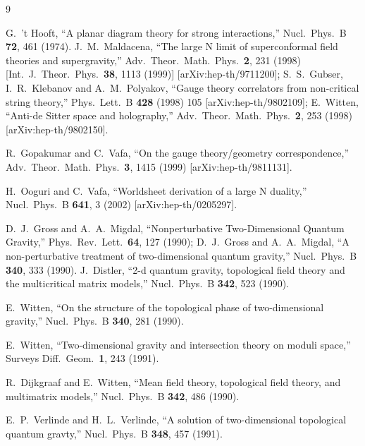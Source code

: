 \documentclass[11pt]{JHEP3}
\begin{document}
\begin{thebibliography}{9}

G.~'t Hooft, 
``A planar diagram theory for strong interactions,''
Nucl.\ Phys.\ B {\bf 72}, 461 (1974).
  J.~M.~Maldacena,
  ``The large N limit of superconformal field theories and supergravity,''
  Adv.\ Theor.\ Math.\ Phys.\  {\bf 2}, 231 (1998)
  [Int.\ J.\ Theor.\ Phys.\  {\bf 38}, 1113 (1999)]
  [arXiv:hep-th/9711200];
  S.~S.~Gubser, I.~R.~Klebanov and A.~M.~Polyakov,
  ``Gauge theory correlators from non-critical string theory,''
  Phys.\ Lett.\ B {\bf 428} (1998) 105
  [arXiv:hep-th/9802109];
  E.~Witten,
  ``Anti-de Sitter space and holography,''
  Adv.\ Theor.\ Math.\ Phys.\  {\bf 2}, 253 (1998)
  [arXiv:hep-th/9802150].

  R.~Gopakumar and C.~Vafa,
  ``On the gauge theory/geometry correspondence,''
  Adv.\ Theor.\ Math.\ Phys.\  {\bf 3}, 1415 (1999)
  [arXiv:hep-th/9811131].
  
  H.~Ooguri and C.~Vafa,
  ``Worldsheet derivation of a large N duality,''
  Nucl.\ Phys.\  B {\bf 641}, 3 (2002)
  [arXiv:hep-th/0205297].

  D.~J.~Gross and A.~A.~Migdal,
  ``Nonperturbative Two-Dimensional Quantum Gravity,''
  Phys.\ Rev.\ Lett.\  {\bf 64}, 127 (1990);
D.~J.~Gross and A.~A.~Migdal,
  ``A non-perturbative treatment of two-dimensional quantum gravity,''
  Nucl.\ Phys.\  B {\bf 340}, 333 (1990).
  J.~Distler,
  ``2-d quantum gravity, topological field theory and the multicritical matrix
  models,''
  Nucl.\ Phys.\  B {\bf 342}, 523 (1990).



  E.~Witten,
  ``On the structure of the topological phase of two-dimensional gravity,''
  Nucl.\ Phys.\  B {\bf 340}, 281 (1990).
  
  E.~Witten,
  ``Two-dimensional gravity and intersection theory on moduli space,''
  Surveys Diff.\ Geom.\  {\bf 1}, 243 (1991).

  R.~Dijkgraaf and E.~Witten,
  ``Mean field theory, topological field theory, and multimatrix models,''
  Nucl.\ Phys.\  B {\bf 342}, 486 (1990).  

  E.~P.~Verlinde and H.~L.~Verlinde,
  ``A solution of two-dimensional topological quantum gravty,''
  Nucl.\ Phys.\  B {\bf 348}, 457 (1991).



\end{thebibliography}
\end{document}
